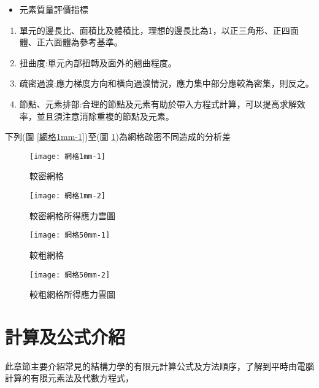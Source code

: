 \begin{itemize}
\item 元素質量評價指標
\end{itemize}

\begin{enumerate}
\item 單元的邊長比、面積比及體積比，理想的邊長比為1，以正三角形、正四面體、正六面體為參考基準。
\item 扭曲度:單元內部扭轉及面外的翹曲程度。
\item 疏密過渡:應力梯度方向和橫向過渡情況，應力集中部分應較為密集，則反之。
\item 節點、元素排部:合理的節點及元素有助於帶入方程式計算，可以提高求解效率，並且須注意消除重複的節點及元素。
\end{enumerate}
下列(圖 \ref{網格1mm-1})至(圖 \ref{網格50mm-2})為網格疏密不同造成的分析差\

\begin{figure}[htbp]
  \centering
  \begin{minipage}{0.45\textwidth}
    \centering
    \texttt{[image: 網格1mm-1]}
    \caption{較密網格}
    \label{網格1mm-1}
  \end{minipage}
  \hfill
  \begin{minipage}{0.45\textwidth}
    \centering
    \texttt{[image: 網格1mm-2]}
    \caption{較密網格所得應力雲圖}
    \label{網格1mm-2}
  \end{minipage}
  
  \vspace{0.75cm} %
  
  \begin{minipage}{0.45\textwidth}
    \centering
    \texttt{[image: 網格50mm-1]}
    \caption{較粗網格}
    \label{網格50mm-1}
  \end{minipage}
  \hfill
  \begin{minipage}{0.45\textwidth}
    \centering
    \texttt{[image: 網格50mm-2]}
    \caption{較粗網格所得應力雲圖}
    \label{網格50mm-2}
  \end{minipage}
\end{figure}
\newpage

\section{計算及公式介紹}
此章節主要介紹常見的結構力學的有限元計算公式及方法順序，了解到平時由電腦計算的有限元素法及代數方程式，


